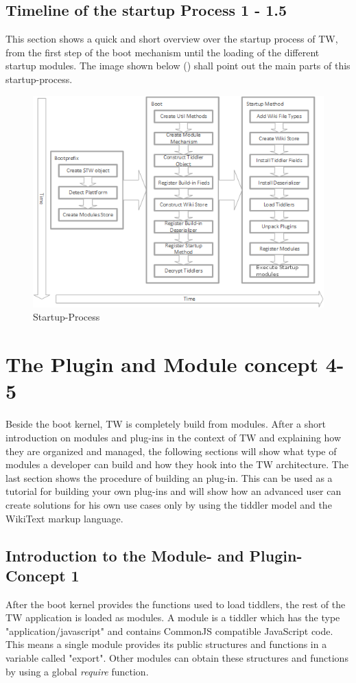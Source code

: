 \documentclass[12pt,a4paper]{article}
\newcommand{\todo}[1]{{\bf TODO: #1}\\
}
\begin{document}
\subsection{Timeline of the startup Process 1 - 1.5}
This section shows a quick and short overview over the startup process of TW, from the first step of the boot mechanism until the loading of the different startup modules. The image shown below () shall point out the main parts of this startup-process.
\begin{figure}[hbtp]
\caption{Startup-Process}
\label{fig:start}
\includegraphics[scale=1]{images/StartupTimeline.png}
\end{figure}
\section{The Plugin and Module concept 4-5}
Beside the boot kernel, TW is completely build from modules.
After a short introduction on modules and plug-ins in the context of TW and explaining how they are organized and managed,
the following sections will show what type of modules a developer can build and how they hook into the TW architecture.
The last section shows the procedure of building an plug-in.
This can be used as a tutorial for building your own plug-ins and will show how an advanced user can create solutions for his own use cases only by using the tiddler model and the WikiText markup language.

\subsection{Introduction to the Module- and Plugin-Concept 1}
After the boot kernel provides the functions used to load tiddlers, the rest of the TW application is loaded as modules.
A module is a tiddler which has the type "application/javascript" and contains CommonJS compatible JavaScript code. This means a single module provides its public structures and functions in a variable called "export". Other modules can obtain these structures and functions by using a global \textit{require} function.
\end{document}

